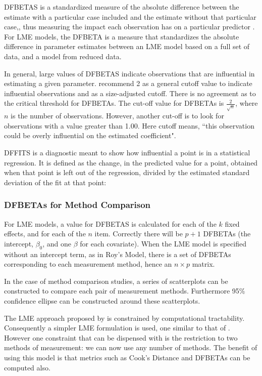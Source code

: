 \documentclass[12pt, a4paper]{report}
\theoremstyle{plain}
\theoremstyle{definition}
\theoremstyle{remark}
\begin{document}
	DFBETAS is a standardized measure of the absolute difference between the estimate with a particular
	case included and the estimate without that particular case,, thus measuring the impact each observation has on a particular predictor \citep{belsley2005}. For LME models, the DFBETA is a measure that standardizes the absolute difference in parameter estimates between an LME model based on a full set of data, and a model from reduced data.
	
	
	
	
	In general, large values of DFBETAS indicate observations that are influential in estimating a given parameter. \citet{belsley2005} recommend 2 as a general cutoff value to indicate influential observations and as a size-adjusted cutoff. There is no agreement as to the critical threshold for DFBETAs. The cut-off value for DFBETAs is $\frac{2}{\sqrt{n}}$, where $n$ is the number of observations. However, another cut-off is to look for observations with a value greater than 1.00. Here cutoff means,
	``this observation could be overly influential on the estimated coefficient".
	
	DFFITS is a diagnostic meant to show how influential a point is in a statistical regression. It is defined as the change, in the predicted value for a point, obtained when that point is left out of the regression, divided by the estimated standard deviation of the fit at that point:
	
	
	
	
	
	
	\subsubsection{DFBETAs for Method Comparison}
	
	For LME models, a value for DFBETAS is calculated for each of the $k$ fixed effects, and for each of the $n$ item. Correctly there will be $p+1$ DFBETAs (the intercept, $\beta_0$, and one $\beta$ for each covariate). When the LME model is specified without an intercept term, as in Roy's Model, there is a set of DFBETAs corresponding to each measurement method, hence an $n \times p$ matrix.
	
	In the case of method comparison studies, a series of scatterplots can be constructed to compare each pair of measurement methods.
	Furthermore 95\% confidence ellipse can be constructed around these scatterplots.
	
	
	
	The LME approach proposed by \citet{ARoy2009} is constrained by computational tractability.
	Consequently a simpler LME formulation is used, one similar to that of \citet{BXC2008}. However one constraint that can be dispensed with is the restriction to
	two methods of measurement: we can now use any number of methods.
	The benefit of using this model is that metrics such as Cook's Distance and DFBETAs can be computed also.
	
\end{document}
